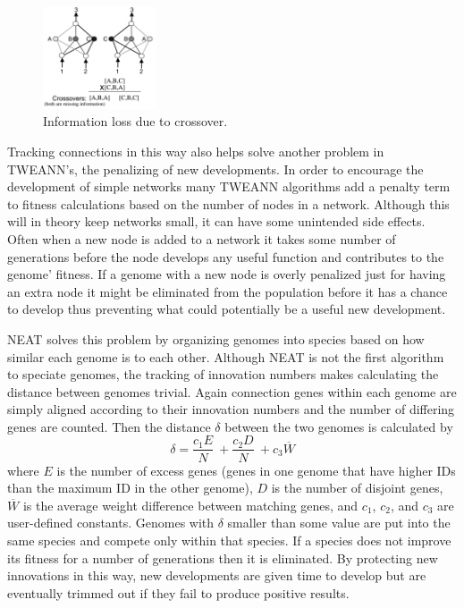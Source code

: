 \documentclass[letterpaper]{article}
\begin{document}
\begin{figure}[h]
	\centering
	\includegraphics[width=0.3\textwidth]{images/crossover.png}
	\caption{Information loss due to crossover.}
	\label{fig:crossover_loss}
\end{figure} 

Tracking connections in this way also helps solve another problem in TWEANN's, the penalizing of new
developments. In order to encourage the development of simple networks many TWEANN algorithms add a penalty
term to fitness calculations based on the number of nodes in a network. Although this will in theory keep
networks small, it can have some unintended side effects. Often when a new node is added to a network
it takes some number of generations before the node develops any useful function and contributes to the 
genome' fitness. If a genome with a new node is overly penalized just for having an extra node it might be
eliminated from the population before it has a chance to develop thus preventing what could potentially be a
useful new development.

NEAT solves this problem by organizing genomes into species based on how similar each genome is to each other.
Although NEAT is not the first algorithm to speciate genomes, the tracking of innovation numbers makes
calculating the distance between genomes trivial. Again connection genes within each genome are simply
aligned according to their innovation numbers and the number of differing genes are counted. Then the distance
$\delta$ between the two genomes is calculated by
\begin{equation}
\delta = \frac{c_1E}{N}\ + \frac{c_2D}{N}\ + c_3\overline{W}
\end{equation}
where $E$ is the number of excess genes (genes in one genome that have higher IDs than the maximum
ID in the other genome), $D$ is the number of disjoint genes, $\overline{W}$ is the average weight
difference between matching genes, and $c_1$, $c_2$, and $c_3$ are user-defined constants. Genomes with 
$\delta$ smaller than some value are put into the same species and compete only within that species. If a
species does not improve its fitness for a number of generations then it is eliminated. By protecting new
innovations in this way, new developments are given time to develop but are eventually trimmed out if they 
fail to produce positive results.
\end{document}
